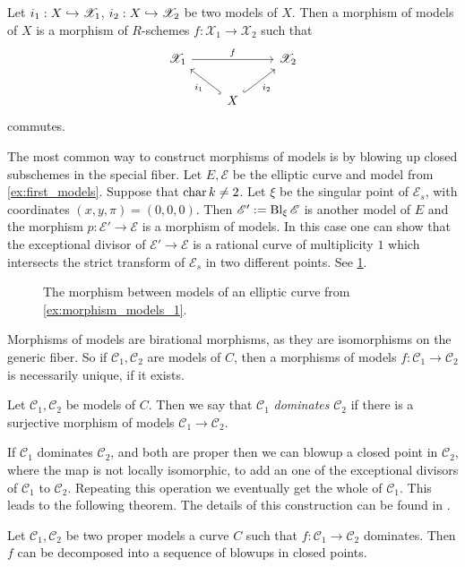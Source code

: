 \begin{definition}
	Let $i_1: X \hookrightarrow \mathscr X_1$, $i_2: X \hookrightarrow \mathscr X_2$ be two models of $X$. 
	Then a morphism of models of $X$ is a morphism of $R$-schemes $f: \mathscr X_1 \to \mathscr X_2$ such that \[
	\begin{tikzcd}
		\mathscr X_1 \ar{rr}{f} & & \mathscr X_2 \\
					& X \ar[hookrightarrow]{ul}{i_1}  \ar[hookrightarrow]{ur}[']{i_2}
	\end{tikzcd}
	\] 
	commutes.
\end{definition}

\begin{example}\label{ex:morphism_models_1}
	The most common way to construct morphisms of models is by blowing up closed subschemes in the special fiber. 
	Let $E, \mathscr E$ be the elliptic curve and model from \cref{ex:first_models}. 
	Suppose that $\operatorname{char} k \ne 2$. 
	Let $\xi$ be the singular point of $\mathscr E _s$, with coordinates $(x, y,\pi) = (0,0,0)$. 
	Then  $\mathscr E' := \operatorname{Bl}_\xi \mathscr E $ is another model of $E$ and the morphism $p:\mathscr E' \to \mathscr E $ is a morphism of models. 
	In this case one can show that the exceptional divisor of $\mathscr E' \to \mathscr E$ is a rational curve of multiplicity $1$ which intersects the strict transform of $\mathscr E _s$ in two different points. 
	See \cref{fig:morphism_models_blowup_1}.
\end{example}

\begin{figure}[h]
    \centering
    \caption{The morphism between models of an elliptic curve from \cref{ex:morphism_models_1}.}
    \label{fig:morphism_models_blowup_1}
\end{figure}

Morphisms of models are birational morphisms, as they are isomorphisms on the generic fiber. So if $\mathscr C_1, \mathscr C_2$ are models of $C$, then a morphisms of models $f: \mathscr C_1 \to \mathscr C_2$ is necessarily unique, if it exists. 

\begin{definition}
	Let $\mathscr C_1, \mathscr C_2$ be models of $C$. 
	Then we say that $\mathscr C_1$ \emph{dominates} $\mathscr C_2$ if there is a surjective morphism of models $\mathscr C_1 \to \mathscr C_2$.
\end{definition}

If $\mathscr C_1 $ dominates $\mathscr C_2$, and both are proper then we can blowup a closed point in $\mathscr C_2$, where the map is not locally isomorphic, to add an one of the exceptional divisors of $\mathscr C_1$ to $\mathscr C_2$. 
Repeating this operation we eventually get the whole of $\mathscr C_1$. 
This leads to the following theorem. The details of this construction can be found in \cite[sec.\ 9.1.2]{liuAlgebraicGeometryArithmetic2002}.
\begin{theorem}\label{thm:factorisation_theorem}
	Let $\mathscr C_1, \mathscr C_2$ be two proper models a curve $C$ such that $f: \mathscr C_1 \to \mathscr C_2$ dominates. 
	Then $f$ can be decomposed into a sequence of blowups in closed points. 
\end{theorem}

